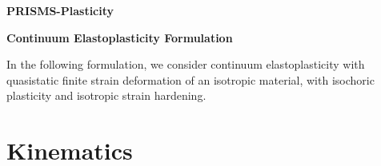 \documentclass[10pt]{article}
\begin{document}
\def\Bomega{\mbox{\boldmath$\omega$}}
\def\Bvarepsilon{\mbox{\boldmath$\varepsilon$}}
\def\Bvartheta{\mbox{\boldmath$\vartheta$}}
\def\Bvarpi{\mbox{\boldmath$\varpi$}}
\def\Bvarrho{\mbox{\boldmath$\varrho$}}
\def\Bvarsigma{\mbox{\boldmath$\varsigma$}}
\def\Bvarphi{\mbox{\boldmath$\varphi$}}
\def\bone{\mathbf{1}}
\def\bzero{\mathbf{0}}
\def\bA{\mbox{\boldmath$ A$}}
\def\bB{\mbox{\boldmath$ B$}}
\def\bC{\mbox{\boldmath$ C$}}
\def\bD{\mbox{\boldmath$ D$}}
\def\bE{\mbox{\boldmath$ E$}}
\def\bF{\mbox{\boldmath$ F$}}
\def\bG{\mbox{\boldmath$ G$}}
\def\bH{\mbox{\boldmath$ H$}}
\def\bI{\mbox{\boldmath$ I$}}
\def\bJ{\mbox{\boldmath$ J$}}
\def\bK{\mbox{\boldmath$ K$}}
\def\bL{\mbox{\boldmath$ L$}}
\def\bM{\mbox{\boldmath$ M$}}
\def\bN{\mbox{\boldmath$ N$}}
\def\bO{\mbox{\boldmath$ O$}}
\def\bP{\mbox{\boldmath$ P$}}
\def\bQ{\mbox{\boldmath$ Q$}}
\def\bR{\mbox{\boldmath$ R$}}
\def\bS{\mbox{\boldmath$ S$}}
\def\bT{\mbox{\boldmath$ T$}}
\def\bU{\mbox{\boldmath$ U$}}
\def\bV{\mbox{\boldmath$ V$}}
\def\bW{\mbox{\boldmath$ W$}}
\def\bX{\mbox{\boldmath$ X$}}
\def\bY{\mbox{\boldmath$ Y$}}
\def\bZ{\mbox{\boldmath$ Z$}}
\def\ba{\mbox{\boldmath$ a$}}
\def\bb{\mbox{\boldmath$ b$}}
\def\bc{\mbox{\boldmath$ c$}}
\def\bd{\mbox{\boldmath$ d$}}
\def\be{\mbox{\boldmath$ e$}}
\def\bff{\mbox{\boldmath$ f$}}
\def\bg{\mbox{\boldmath$ g$}}
\def\bh{\mbox{\boldmath$ h$}}
\def\bi{\mbox{\boldmath$ i$}}
\def\bj{\mbox{\boldmath$ j$}}
\def\bk{\mbox{\boldmath$ k$}}
\def\bl{\mbox{\boldmath$ l$}}
\def\bm{\mbox{\boldmath$ m$}}
\def\bn{\mbox{\boldmath$ n$}}
\def\bo{\mbox{\boldmath$ o$}}
\def\bp{\mbox{\boldmath$ p$}}
\def\bq{\mbox{\boldmath$ q$}}
\def\br{\mbox{\boldmath$ r$}}
\def\bs{\mbox{\boldmath$ s$}}
\def\bt{\mbox{\boldmath$ t$}}
\def\bu{\mbox{\boldmath$ u$}}
\def\bv{\mbox{\boldmath$ v$}}
\def\bw{\mbox{\boldmath$ w$}}
\def\bx{\mbox{\boldmath$ x$}}
\def\by{\mbox{\boldmath$ y$}}
\def\bz{\mbox{\boldmath$ z$}}
\centerline{\Large{\bf PRISMS-Plasticity}}
\smallskip
\centerline{\Large{\bf Continuum Elastoplasticity Formulation}}
\bigskip
In the following formulation, we consider continuum elastoplasticity with quasistatic finite strain deformation of an isotropic material, with isochoric plasticity and isotropic strain hardening.

\section{Kinematics}
\end{document}
